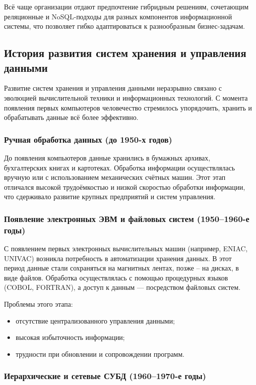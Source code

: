 Всё чаще организации отдают предпочтение гибридным решениям, сочетающим реляционные и NoSQL-подходы для разных компонентов информационной системы, что позволяет гибко адаптироваться к разнообразным бизнес-задачам.

\subsection{История развития систем хранения и управления данными}

Развитие систем хранения и управления данными неразрывно связано с эволюцией вычислительной техники и информационных технологий. С момента появления первых компьютеров человечество стремилось упорядочить, хранить и обрабатывать данные всё более эффективно.

\subsubsection{Ручная обработка данных (до 1950-х годов)}

До появления компьютеров данные хранились в бумажных архивах, бухгалтерских книгах и картотеках. Обработка информации осуществлялась вручную или с использованием механических счётных машин. Этот этап отличался высокой трудоёмкостью и низкой скоростью обработки информации, что сдерживало развитие крупных предприятий и систем управления.

\subsubsection{Появление электронных ЭВМ и файловых систем (1950--1960-е годы)}

С появлением первых электронных вычислительных машин (например, ENIAC, UNIVAC) возникла потребность в автоматизации хранения данных. В этот период данные стали сохраняться на магнитных лентах, позже -- на дисках, в виде файлов. Обработка осуществлялась с помощью процедурных языков (COBOL, FORTRAN), а доступ к данным — посредством файловых систем.

Проблемы этого этапа:
\begin{itemize}
	\item отсутствие централизованного управления данными;
	\item высокая избыточность информации;
	\item трудности при обновлении и сопровождении программ.
\end{itemize}

\subsubsection{Иерархические и сетевые СУБД (1960--1970-е годы)}

